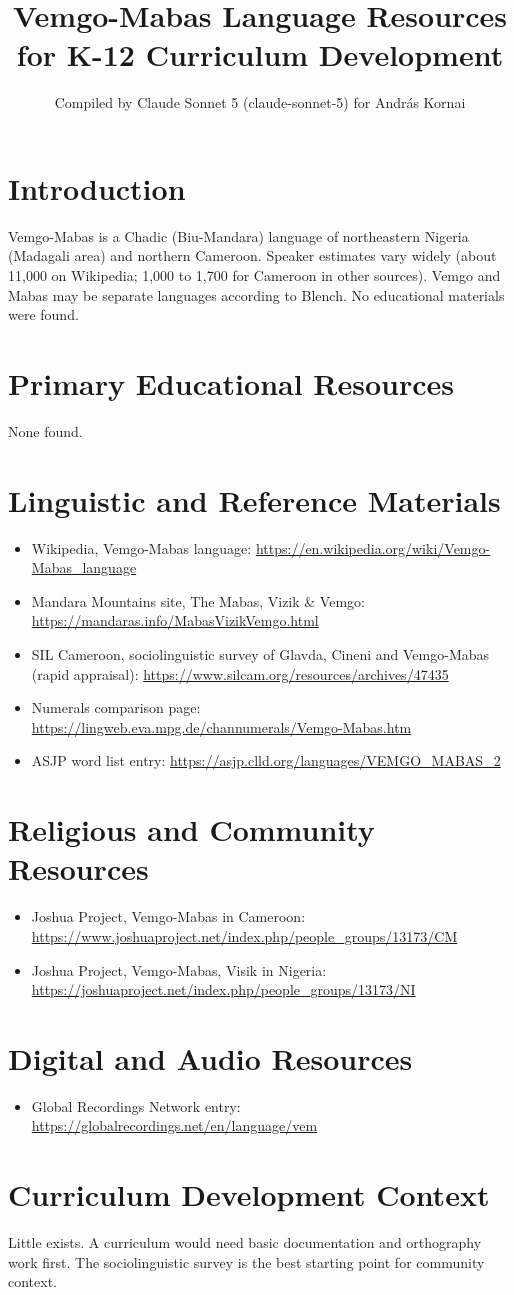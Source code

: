 \documentclass[12pt]{article}
\title{Vemgo-Mabas Language Resources for K-12 Curriculum Development}
\author{Compiled by Claude Sonnet 5 (claude-sonnet-5) for Andr\'as Kornai}
\date{}
\begin{document}
\maketitle
\section{Introduction}
Vemgo-Mabas is a Chadic (Biu-Mandara) language of northeastern Nigeria (Madagali area) and northern Cameroon. Speaker estimates vary widely (about 11,000 on Wikipedia; 1,000 to 1,700 for Cameroon in other sources). Vemgo and Mabas may be separate languages according to Blench. No educational materials were found.
\section{Primary Educational Resources}
None found.
\section{Linguistic and Reference Materials}
\begin{itemize}
\item Wikipedia, Vemgo-Mabas language: \url{https://en.wikipedia.org/wiki/Vemgo-Mabas_language}
\item Mandara Mountains site, The Mabas, Vizik \& Vemgo: \url{https://mandaras.info/MabasVizikVemgo.html}
\item SIL Cameroon, sociolinguistic survey of Glavda, Cineni and Vemgo-Mabas (rapid appraisal): \url{https://www.silcam.org/resources/archives/47435}
\item Numerals comparison page: \url{https://lingweb.eva.mpg.de/channumerals/Vemgo-Mabas.htm}
\item ASJP word list entry: \url{https://asjp.clld.org/languages/VEMGO_MABAS_2}
\end{itemize}
\section{Religious and Community Resources}
\begin{itemize}
\item Joshua Project, Vemgo-Mabas in Cameroon: \url{https://www.joshuaproject.net/index.php/people_groups/13173/CM}
\item Joshua Project, Vemgo-Mabas, Visik in Nigeria: \url{https://joshuaproject.net/index.php/people_groups/13173/NI}
\end{itemize}
\section{Digital and Audio Resources}
\begin{itemize}
\item Global Recordings Network entry: \url{https://globalrecordings.net/en/language/vem}
\end{itemize}
\section{Curriculum Development Context}
Little exists. A curriculum would need basic documentation and orthography work first. The sociolinguistic survey is the best starting point for community context.
\end{document}
